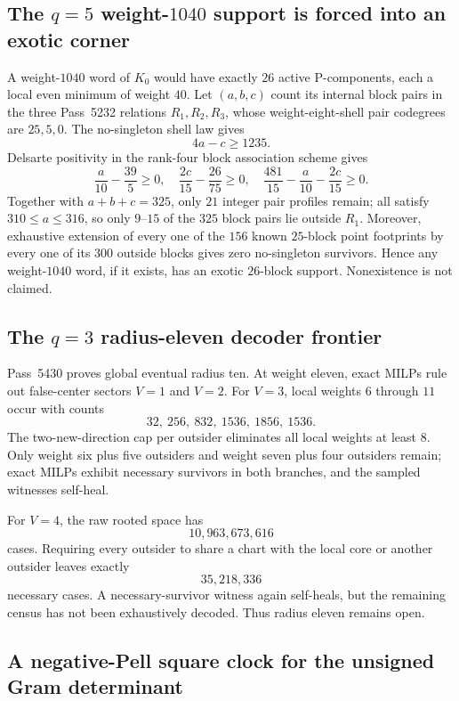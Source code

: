 \subsection{The $q=5$ weight-$1040$ support is forced into an exotic corner}

A weight-$1040$ word of $K_0$ would have exactly $26$ active P-components, each
a local even minimum of weight $40$.  Let $(a,b,c)$ count its internal block
pairs in the three Pass~5232 relations $R_1,R_2,R_3$, whose weight-eight-shell
pair codegrees are $25,5,0$.  The no-singleton shell law gives
\[
 4a-c\ge1235.
\]
Delsarte positivity in the rank-four block association scheme gives
\[
 \frac a{10}-\frac{39}{5}\ge0,
 \quad
 \frac{2c}{15}-\frac{26}{75}\ge0,
 \quad
 \frac{481}{15}-\frac a{10}-\frac{2c}{15}\ge0.
\]
Together with $a+b+c=325$, only $21$ integer pair profiles remain; all satisfy
$310\le a\le316$, so only $9$--$15$ of the $325$ block pairs lie outside $R_1$.
Moreover, exhaustive extension of every one of the $156$ known $25$-block point
footprints by every one of its $300$ outside blocks gives zero no-singleton
survivors.  Hence any weight-$1040$ word, if it exists, has an exotic $26$-block
support.  Nonexistence is not claimed.

\subsection{The $q=3$ radius-eleven decoder frontier}

Pass~5430 proves global eventual radius ten.  At weight eleven, exact MILPs rule
out false-center sectors $V=1$ and $V=2$.  For $V=3$, local weights $6$ through
$11$ occur with counts
\[
 32,\ 256,\ 832,\ 1536,\ 1856,\ 1536.
\]
The two-new-direction cap per outsider eliminates all local weights at least
$8$.  Only weight six plus five outsiders and weight seven plus four outsiders
remain; exact MILPs exhibit necessary survivors in both branches, and the sampled
witnesses self-heal.

For $V=4$, the raw rooted space has
\[
 \boxed{10{,}963{,}673{,}616}
\]
cases.  Requiring every outsider to share a chart with the local core or another
outsider leaves exactly
\[
 \boxed{35{,}218{,}336}
\]
necessary cases.  A necessary-survivor witness again self-heals, but the remaining
census has not been exhaustively decoded.  Thus radius eleven remains open.

\subsection{A negative-Pell square clock for the unsigned Gram determinant}

